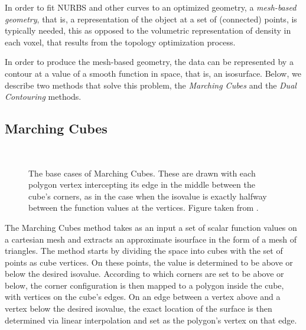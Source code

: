 
In order to fit NURBS and other curves to an optimized geometry, a \emph{mesh-based geometry}, that is, a representation of the object at a set of (connected) points, is typically needed, this as opposed to the volumetric representation of density in each voxel, that results from the topology optimization process. 

In order to produce the mesh-based geometry, the data can be represented by a contour at a value of a smooth function in space, that is, an isosurface. Below, we describe two methods that solve this problem, the \emph{Marching Cubes} and the \emph{Dual Contouring} methods.%

\subsection{Marching Cubes} 
\begin{figure}
\centering
   \\
   \caption{The base cases of Marching Cubes. These are drawn with each polygon vertex intercepting its edge in the middle between the cube's corners, as in the case when the isovalue is exactly halfway between the function values at the vertices. Figure taken from \cite{Marching2006}. }
   \label{fig:MC_basecase}
\end{figure}
The Marching Cubes method \cite{Marching2006} takes as an input a set of scalar function values on a cartesian mesh and extracts an approximate isourface in the form of a mesh of triangles. The method starts by
dividing the space into cubes with the set of points as cube vertices. On these points, the value is determined to be above or below the desired isovalue. According to which corners are set to be above or below, the corner configuration is then mapped to a polygon inside the cube, with vertices on the cube's edges. On an edge between a vertex above and a vertex below the desired isovalue, the exact location of the surface is then determined via linear interpolation and set as the polygon's vertex on that edge.

